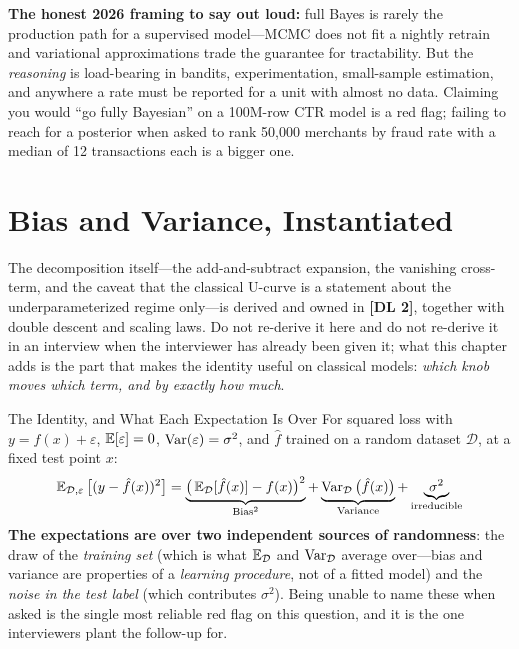 \textbf{The honest 2026 framing to say out loud:} full Bayes is rarely the production path for a supervised model---MCMC does not fit a nightly retrain and variational approximations trade the guarantee for tractability. But the \textit{reasoning} is load-bearing in bandits, experimentation, small-sample estimation, and anywhere a rate must be reported for a unit with almost no data. Claiming you would ``go fully Bayesian'' on a 100M-row CTR model is a red flag; failing to reach for a posterior when asked to rank 50,000 merchants by fraud rate with a median of 12 transactions each is a bigger one.

\section{Bias and Variance, Instantiated}
\label{cml:sec:bias_variance_classical}

The decomposition itself---the add-and-subtract expansion, the vanishing cross-term, and the caveat that the classical U-curve is a statement about the underparameterized regime only---is derived and owned in \textbf{[DL 2]}, together with double descent and scaling laws. Do not re-derive it here and do not re-derive it in an interview when the interviewer has already been given it; what this chapter adds is the part that makes the identity useful on classical models: \textit{which knob moves which term, and by exactly how much}.

\begin{mathresult}{The Identity, and What Each Expectation Is Over}
For squared loss with $y = f(x) + \varepsilon$, $\operatorname{\mathbb{E}}[\varepsilon]=0$, $\operatorname{Var}(\varepsilon)=\sigma^2$, and $\hat f$ trained on a random dataset $\mathcal{D}$, at a fixed test point $x$:
\begin{equation}
\operatorname{\mathbb{E}}_{\mathcal{D},\varepsilon}\big[(y - \hat f(x))^2\big] = \underbrace{\big(\operatorname{\mathbb{E}}_\mathcal{D}[\hat f(x)] - f(x)\big)^2}_{\text{Bias}^2} + \underbrace{\operatorname{Var}_\mathcal{D}\big(\hat f(x)\big)}_{\text{Variance}} + \underbrace{\sigma^2}_{\text{irreducible}}
\end{equation}
\textbf{The expectations are over two independent sources of randomness}: the draw of the \textit{training set} (which is what $\operatorname{\mathbb{E}}_\mathcal{D}$ and $\operatorname{Var}_\mathcal{D}$ average over---bias and variance are properties of a \textit{learning procedure}, not of a fitted model) and the \textit{noise in the test label} (which contributes $\sigma^2$). Being unable to name these when asked is the single most reliable red flag on this question, and it is the one interviewers plant the follow-up for.
\end{mathresult}

